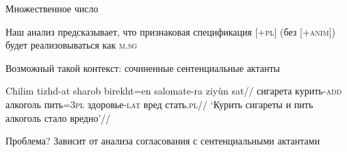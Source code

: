 \documentclass[xcolor=table]{beamer}
\begin{document}
\begin{frame}{Множественное число}

	Наш анализ предсказывает, что признаковая спецификация [\textsc{+pl}] (без [\textsc{+anim}]) будет реализовываться как \textsc{m.sg}

	Возможный такой контекст: сочиненные сентенциальные актанты

	\ex \begingl 
		\gla Chilim          tizhd-at sharob                    birekht=en salomate-ra ziyùn sat//
		\glb сигарета   курить-\textsc{add} алкоголь      пить=\textsc{3pl}   здоровье-\textsc{lat} вред стать.\textsc{pl}//
		\glft `Курить сигареты и пить алкоголь стало вредно'//
	\endgl \xe

	Проблема? Зависит от анализа согласования с сентенциальными актантами

\end{frame}
\end{document}
